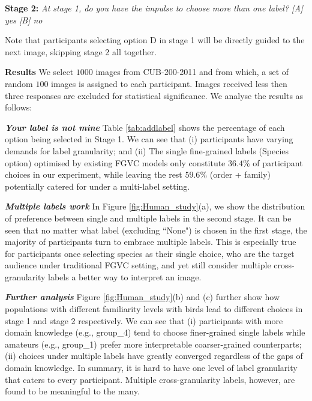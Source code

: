 \documentclass[final]{cvpr}
\newcommand{\keypoint}[1]{\vspace{0.05cm}\noindent\textbf{#1}\quad}
\begin{document}
\noindent\textbf{Stage 2:} \textit{At stage 1, do you have the impulse to choose more than one label? [A] yes [B] no}

\noindent Note that participants selecting option D in stage 1 will be directly guided to the next image, skipping stage 2 all together. 


\keypoint{Results} We select $1000$ images from CUB-200-2011 and from which, a set of random $100$ images is assigned to each participant. Images received less then three responses are excluded for statistical significance. We analyse the results as follows:


\keypoint{\textit{Your label is not mine}} Table \ref{tab:addlabel} shows the percentage of each option being selected in Stage 1. We can see that (i) participants have varying demands for label granularity; and (ii) The single fine-grained labels (Species option) optimised by existing FGVC models only constitute $36.4\%$ of participant choices in our experiment, while leaving the rest $59.6\%$ (order + family) potentially catered for under a multi-label setting.



\keypoint{\textit{Multiple labels work}} In Figure \ref{fig:Human_study}(a), we show the distribution of preference between single and multiple labels in the second stage. It can be seen that no matter what label (excluding ``None") is chosen in the first stage, the majority of participants turn to embrace multiple labels. This is especially true for participants once selecting species as their single choice, who are the target audience under traditional FGVC setting, and yet still consider multiple cross-granularity labels a better way to interpret an image. 



\keypoint{\textit{Further analysis}} Figure \ref{fig:Human_study}(b) and (c) further show how populations with different familiarity levels with birds lead to different choices in stage 1 and stage 2 respectively. We can see that (i) participants with more domain knowledge (e.g., group\_4) tend to choose finer-grained single labels while amateurs (e.g., group\_1) prefer more interpretable coarser-grained counterparts; (ii) choices under multiple labels have greatly converged regardless of the gaps of domain knowledge. In summary, it is hard to have one level of label granularity that caters to every participant. Multiple cross-granularity labels, however, are found to be meaningful to the many.
\end{document}
